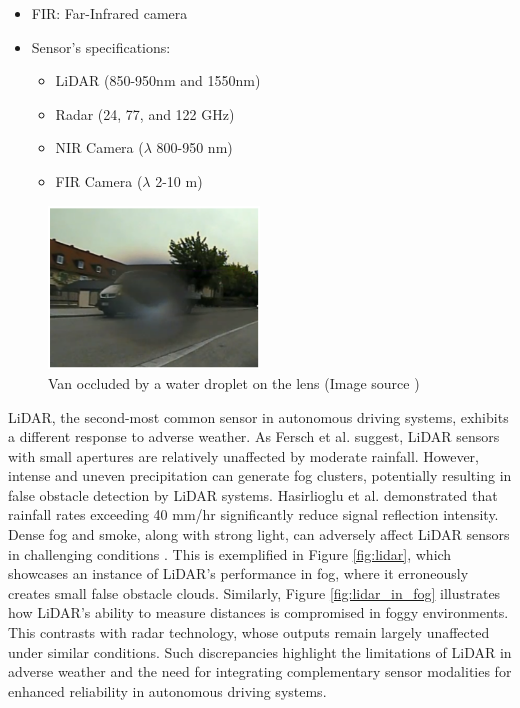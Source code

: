 \documentclass[report.tex]{subfiles}
\begin{document}
\begin{table}
\begin{tablenotes}
\begin{itemize}
                \item FIR: Far-Infrared camera
                \item Sensor's specifications:
                \begin{itemize}
                    \item LiDAR (850-950nm and 1550nm)
                    \item Radar (24, 77, and 122 GHz)
                    \item NIR Camera ($\lambda$ 800-950 nm)
                    \item FIR Camera ($\lambda$ 2-10 \textmu m)
                \end{itemize}
            \end{itemize}
        \end{tablenotes}
    \end{table}

    
    \begin{figure}[h]
        \centering
        \includegraphics[width=0.5\textwidth]{images/rain_droplet.png}
        \caption{Van occluded by a water droplet on the lens (Image source \cite{Nobis2020May})}
        \label{fig:camera_in_rain}
    \end{figure}
    
    LiDAR, the second-most common sensor in autonomous driving systems, exhibits a different response to adverse weather. As Fersch et al. \cite{fersch2016influence} suggest, LiDAR sensors with small apertures are relatively unaffected by moderate rainfall. However, intense and uneven precipitation can generate fog clusters, potentially resulting in false obstacle detection by LiDAR systems. Hasirlioglu et al. \cite{hasirlioglu2016modeling} demonstrated that rainfall rates exceeding 40 mm/hr significantly reduce signal reflection intensity. Dense fog and smoke, along with strong light, can adversely affect LiDAR sensors in challenging conditions \cite{zhang2023perception, acarballo2020libre}. This is exemplified in Figure \ref{fig:lidar}, which showcases an instance of LiDAR's performance in fog, where it erroneously creates small false obstacle clouds. Similarly, Figure \ref{fig:lidar_in_fog} illustrates how LiDAR's ability to measure distances is compromised in foggy environments. This contrasts with radar technology, whose outputs remain largely unaffected under similar conditions. Such discrepancies highlight the limitations of LiDAR in adverse weather and the need for integrating complementary sensor modalities for enhanced reliability in autonomous driving systems.
\end{document}

